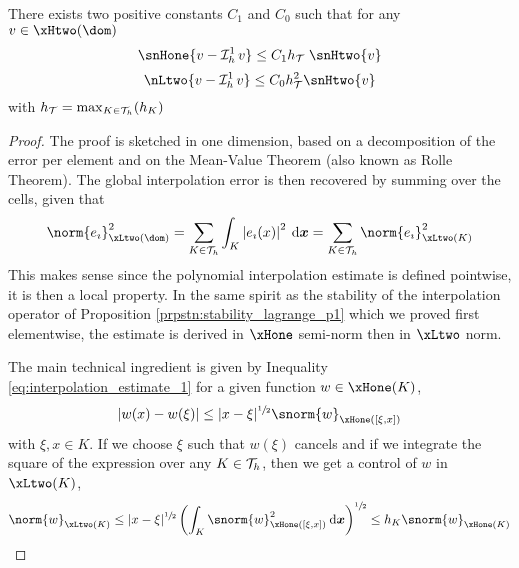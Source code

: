 \begin{prpstn}
\label{prpstn:interpolation_p1}
There exists two positive constants $C_1$ and $C_0$ such that for any $v\in\xHtwo(\dom)$
\begin{equation}
\snHone{v - \Lgrh{1}v}  \leq C_1 \sizeT\;\snHtwo{v}
\end{equation}
\begin{equation}
\nLtwo{v - \Lgrh{1}v}  \leq C_0 \sizeT^2 \snHtwo{v}
\end{equation}
with $h_{\mathcal T} = \max_{K\in{\mathcal T}_h}(h_K)$
\end{prpstn}
\begin{proof}
The proof is sketched in one dimension, based on a decomposition of the error per element and on the Mean-Value Theorem (also known as Rolle Theorem).
The global interpolation error is then recovered by summing over the cells, given that
\begin{equation*}
\norm{e_\imath}^2_{\xLtwo(\dom)} = \sum_{K\in\meshT} \int_K\Abs{e_\imath(x)}^2 \dxx = \sum_{K\in\meshT} \norm{e_\imath}^2_{\xLtwo(K)}
\end{equation*}
This makes sense since the polynomial interpolation estimate is defined pointwise, it is then a local property.
In the same spirit as the stability of the interpolation operator of Proposition \ref{prpstn:stability_lagrange_p1} which we proved first elementwise, the estimate is derived in $\xHone$ semi-norm then in $\xLtwo$ norm.

\medskip
The main technical ingredient is given by Inequality \eqref{eq:interpolation_estimate_1} for a given function $w\in\xHone(K)$,
\begin{equation}\label{eq:interpolation_estimate_trick_1}
\Abs{w(x) - w(\xi)} \leq \displaystyle|x - \xi|^{\sfrac{1}{2}}\snorm{w}_{\xHone([\xi, x])}
\end{equation}
with $\xi, x\in K$.
If we choose $\xi$ such that $w(\xi)$ cancels and if we integrate the square of the expression over any $K\in{\mathcal T}_h$, then we get a control of $w$ in $\xLtwo(K)$,
\begin{equation}\label{eq:interpolation_estimate_trick_2}
\norm{w}_{\xLtwo(K)} \leq \displaystyle|x - \xi|^{\sfrac{1}{2}}\left(\int_K \snorm{w}^2_{\xHone([\xi, x])}\dxx\right)^{\sfrac{1}{2}} \leq h_K\snorm{w}_{\xHone(K)}
\end{equation}


\end{proof}

